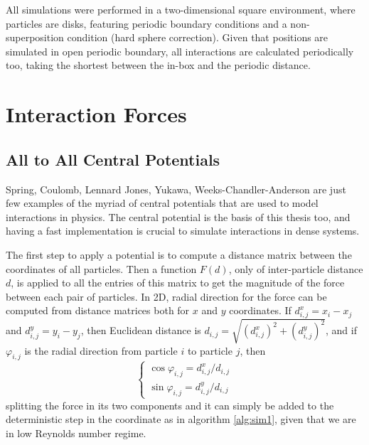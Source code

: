 \documentclass[../../master_thesis_np.tex]{subfiles}
\begin{document}
	All simulations were performed in a two-dimensional square environment, where particles are disks, featuring periodic boundary conditions and a non-superposition condition (hard sphere correction). 
	Given that positions are simulated in open periodic boundary, all interactions are calculated periodically too, taking the shortest between the in-box and the periodic distance.

	\section{Interaction Forces}
	
	\subsection{All to All Central Potentials}

	Spring, Coulomb, Lennard Jones, Yukawa, Weeks-Chandler-Anderson are just few examples of the myriad of central potentials that are used to model interactions in physics. 
	The central potential is the basis of this thesis too, and having a fast implementation is crucial to simulate interactions in dense systems. 
	
	The first step {\color{brown}to apply a potential} is to compute a distance matrix between the coordinates of all particles. 
	Then a function $F(d)$, only of inter-particle distance $d$, is applied to all the entries of this matrix to get the magnitude of the force between each pair of particles. 
	In 2D, radial direction for the force can be computed from distance matrices both for $x$ and $y$ coordinates. 
	If $d^x_{i,j} = x_i - x_j$ and $d^y_{i,j} = y_i - y_j$, then Euclidean distance is $d_{i,j} = \sqrt{(d^x_{i,j})^2 + (d^y_{i,j})^2}$, and if $\varphi_{i,j}$ is the radial direction from particle $i$ to particle $j$, then
	\begin{equation}
		\begin{cases}
			\cos\varphi_{i,j} = d^x_{i,j}/d_{i,j}\\
			\sin\varphi_{i,j} = d^y_{i,j}/d_{i,j}
		\end{cases}
	\end{equation}
	splitting the force in its two components and it can simply be added to the deterministic step in the coordinate as in algorithm \ref{alg:sim1}, given that we are in low Reynolds number regime. 
	
\end{document}
